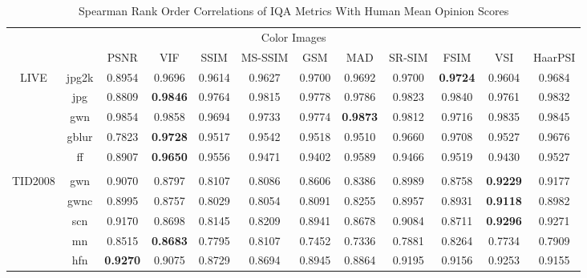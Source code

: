 \documentclass[11pt,a4paper]{article}
\begin{document}
\FloatBarrier
\setlength{\tabcolsep}{1mm}
\begin{table}[!htb]
	\centering
	\caption{Spearman Rank Order Correlations of IQA Metrics With Human Mean Opinion Scores}
	\label{tab:details}
	\begin{scriptsize}
		\begin{threeparttable}
			\begin{tabular}{*{12}{c}}
				\toprule[0.5mm]
				\multicolumn{12}{c}{Color Images}\\[0.1cm]
				& & PSNR & VIF & SSIM & MS-SSIM & GSM & MAD & SR-SIM & FSIM & VSI & HaarPSI\\
				\multirow{5}{*}{LIVE} & jpg2k & \cellcolor{green!25}0.8954 & 0.9696 & 0.9614 & 0.9627 & 0.9700 & 0.9692 & 0.9700 & \textbf{0.9724} & 0.9604 & 0.9684\\
				& jpg & \cellcolor{green!25}0.8809 & \textbf{0.9846} & 0.9764 & 0.9815 & 0.9778 & 0.9786 & 0.9823 & 0.9840 & 0.9761 & 0.9832\\
				& gwn & 0.9854 & 0.9858 & \cellcolor{green!25}0.9694 & \cellcolor{green!25}0.9733 & 0.9774 & \textbf{0.9873} & 0.9812 & \cellcolor{green!25}0.9716 & 0.9835 & 0.9845\\
				& gblur & \cellcolor{green!25}0.7823 & \textbf{0.9728} & 0.9517 & 0.9542 & 0.9518 & 0.9510 & 0.9660 & 0.9708 & 0.9527 & 0.9676\\
				& ff & \cellcolor{green!25}0.8907 & \textbf{0.9650} & 0.9556 & 0.9471 & 0.9402 & 0.9589 & 0.9466 & 0.9519 & 0.9430 & 0.9527\\
				\\
				\multirow{17}{*}{TID2008} & gwn & 0.9070 & 0.8797 & \cellcolor{green!25}0.8107 & \cellcolor{green!25}0.8086 & 0.8606 & \cellcolor{green!25}0.8386 & 0.8989 & 0.8758 & \textbf{0.9229} & 0.9177\\
				& gwnc & 0.8995 & 0.8757 & \cellcolor{green!25}0.8029 & \cellcolor{green!25}0.8054 & \cellcolor{green!25}0.8091 & 0.8255 & 0.8957 & 0.8931 & \textbf{0.9118} & 0.8982\\
				& scn & 0.9170 & \cellcolor{green!25}0.8698 & \cellcolor{green!25}0.8145 & \cellcolor{green!25}0.8209 & 0.8941 & \cellcolor{green!25}0.8678 & 0.9084 & \cellcolor{green!25}0.8711 & \textbf{0.9296} & 0.9271\\
				& mn & 0.8515 & \textbf{0.8683} & 0.7795 & 0.8107 & 0.7452 & 0.7336 & 0.7881 & 0.8264 & 0.7734 & 0.7909\\
				& hfn & \textbf{0.9270} & 0.9075 & 0.8729 & 0.8694 & 0.8945 & 0.8864 & 0.9195 & 0.9156 & 0.9253 & 0.9155\\

\end{tabular}
\end{threeparttable}
\end{scriptsize}
\end{table}
\end{document}
